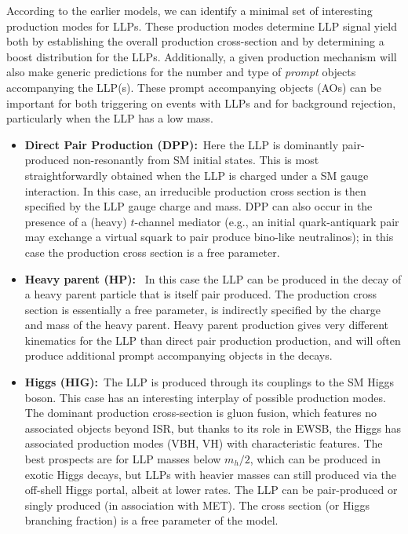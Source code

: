 According to the earlier models, we can identify a minimal set of interesting production modes for LLPs.
These production modes determine LLP signal yield both by establishing the overall production cross-section and by determining a boost distribution for the LLPs.   Additionally, a given production mechanism will also  make generic predictions for the number and type of {\em prompt} objects accompanying the LLP(s).  These prompt accompanying objects (AOs) can be important for both triggering on events with LLPs and for background rejection, particularly when the LLP has a low mass. 

%
\begin{itemize}

\item {\bf Direct Pair Production (DPP):}~Here the LLP is dominantly pair-produced non-resonantly from SM initial states.  This is most straightforwardly obtained when the LLP is charged under a SM gauge interaction.  
In this case, an irreducible production cross section is then specified by the LLP gauge charge and mass.  DPP can also occur in the presence of a (heavy) $t$-channel mediator (e.g., an initial quark-antiquark pair may exchange a virtual squark to pair produce bino-like neutralinos); in this case the production cross section is a free parameter.

\item {\bf Heavy parent (HP):}~ In this case the LLP can be produced in the decay of a heavy parent particle that is itself pair produced. The production cross section is essentially a free parameter, is indirectly specified by the charge and mass of the heavy parent. Heavy parent production gives very different kinematics for the LLP than direct pair production production, and will often produce additional prompt accompanying objects in the decays.

\item {\bf Higgs (HIG):}~The LLP is produced through its couplings to the SM Higgs boson.  This case has an interesting interplay of possible production modes. The dominant production cross-section is  gluon fusion, which features no associated objects beyond ISR, but thanks to its role in EWSB, the Higgs has associated production modes (VBH, VH) with characteristic features. The best prospects are for LLP masses below $m_h/2$, which can be produced in exotic Higgs decays, but LLPs with heavier masses can still produced via the off-shell Higgs portal, albeit at lower rates. The LLP can be pair-produced or singly produced (in association with MET). The cross section (or Higgs branching fraction) is a free parameter of the model.



\end{itemize}
